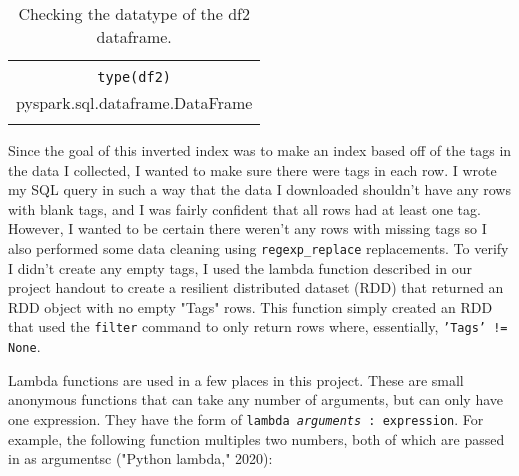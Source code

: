 \documentclass[]{article}
\newcommand{\code}[1]{\colorbox{light-gray}{\texttt{#1}}}
\begin{document}
\begin{table}[!ht]
	\begin{center}
		\caption{Checking the datatype of the df2 dataframe.}
		\label{tab:table1}
		\begin{tabular}{|c|} 
			\hline
			\\
			\code{type(df2)}\\
			\hline
			pyspark.sql.dataframe.DataFrame\\
			\\
			\hline
		\end{tabular}
	\end{center}
\end{table}

Since the goal of this inverted index was to make an index based off of the tags in the data I collected, I wanted to make sure there were tags in each row.  I wrote my SQL query in such a way that the data I downloaded shouldn't have any rows with blank tags, and I was fairly confident that all rows had at least one tag.  However, I wanted to be certain there weren't any rows with missing tags so I also performed some data cleaning using \code{regexp\_replace} replacements.  To verify I didn't create any empty tags, I used the lambda function described in our project handout to create a resilient distributed dataset (RDD) that returned an RDD object with no empty "Tags" rows.  This function simply created an RDD that used the \code{filter} command to only return rows where, essentially, \code{'Tags' != None}.

Lambda functions are used in a few places in this project.  These are small anonymous functions that can take any number of arguments, but can only have one expression.  They have the form of \code{lambda \textit{arguments} : expression}.  For example, the following function multiples two numbers, both of which are passed in as argumentsc ("Python lambda," 2020):
\end{document}
